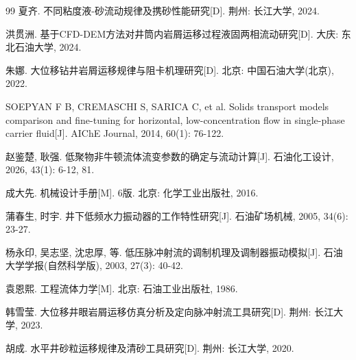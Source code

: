 \begin{thebibliography}{99}
夏齐. 不同粘度液-砂流动规律及携砂性能研究[D]. 荆州: 长江大学, 2024.

洪贯洲. 基于CFD-DEM方法对井筒内岩屑运移过程液固两相流动研究[D]. 大庆: 东北石油大学, 2024.

朱娜. 大位移钻井岩屑运移规律与阻卡机理研究[D]. 北京: 中国石油大学(北京), 2022.

SOEPYAN F B, CREMASCHI S, SARICA C, et al. Solids transport models comparison and fine-tuning for horizontal, low-concentration flow in single-phase carrier fluid[J]. AIChE Journal, 2014, 60(1): 76-122.

赵鉴楚, 耿强. 低聚物非牛顿流体流变参数的确定与流动计算[J]. 石油化工设计, 2026, 43(1): 6-12, 81.

成大先. 机械设计手册[M]. 6版. 北京: 化学工业出版社, 2016.

蒲春生, 时宇. 井下低频水力振动器的工作特性研究[J]. 石油矿场机械, 2005, 34(6): 23-27.

杨永印, 吴志坚, 沈忠厚, 等. 低压脉冲射流的调制机理及调制器振动模拟[J]. 石油大学学报(自然科学版), 2003, 27(3): 40-42.

袁恩熙. 工程流体力学[M]. 北京: 石油工业出版社, 1986.

韩雪莹. 大位移井眼岩屑运移仿真分析及定向脉冲射流工具研究[D]. 荆州: 长江大学, 2023.

胡成. 水平井砂粒运移规律及清砂工具研究[D]. 荆州: 长江大学, 2020.

\end{thebibliography}
